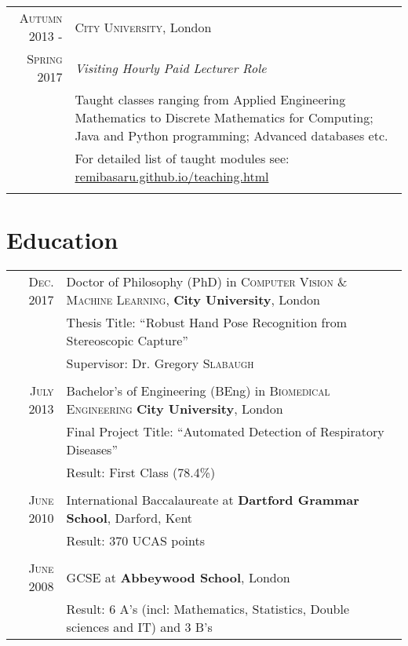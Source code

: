 \documentclass[letterpaper,11pt]{article}
\begin{document}
\begin{tabular}{r|p{14cm}}
\textsc{Autumn 2013 -} & \textsc{City University}, London \\
\textsc{ Spring 2017} &\emph{Visiting Hourly Paid Lecturer Role}\\
&\footnotesize{
Taught classes ranging from Applied Engineering Mathematics  to  Discrete Mathematics for Computing; Java and Python programming; Advanced databases etc.}\\
&\normalsize \textsc{ } \hfill \footnotesize For detailed list of taught modules see: \href{remibasaru.github.io/teaching.html}{remibasaru.github.io/teaching.html}\\
\multicolumn{2}{c}{} \\

\end{tabular}


\section{Education}
\begin{tabular}{rp{14cm}}	
 \textsc{Dec.} 2017 & Doctor of Philosophy (PhD) in \textsc{Computer Vision \& Machine Learning}, \textbf{City University}, London\\
& Thesis Title: ``Robust Hand Pose Recognition from Stereoscopic Capture'' \\
& \small Supervisor: Dr. Gregory \textsc{Slabaugh}\\
\\

\textsc{July} 2013 & Bachelor's of Engineering (BEng) in \textsc{Biomedical Engineering} \textbf{City University}, London \\
& Final Project Title: ``Automated Detection of Respiratory Diseases'' \\
& \small Result: First Class (78.4\%)\\
\\

\textsc{June} 2010 & International Baccalaureate at \textbf{Dartford Grammar School}, Darford, Kent\\
& \small Result:  370 UCAS points \\&\\

\textsc{June} 2008 & GCSE at \textbf{Abbeywood School}, London \\
& \small Result: 6 A's (incl: Mathematics, Statistics, Double sciences and IT) and  3 B's  \\
\end{tabular}
\end{document}
